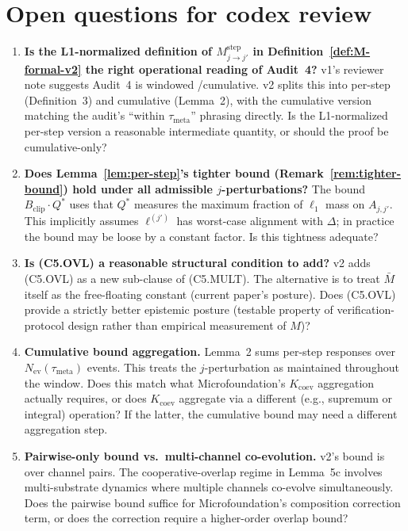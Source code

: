 \documentclass{article}
\newcommand{\Bclip}{B_{\mathrm{clip}}}
\newcommand{\Nev}{N_{\mathrm{ev}}}
\newcommand{\taumeta}{\tau_{\mathrm{meta}}}
\begin{document}
\section{Open questions for codex review}

\begin{enumerate}
\item \textbf{Is the L1-normalized definition of
  $M_{j \to j'}^{\mathrm{step}}$ in
  Definition~\ref{def:M-formal-v2} the right operational reading
  of Audit~4?}  v1's reviewer note suggests Audit~4 is windowed
  /cumulative.  v2 splits this into per-step (Definition~3) and
  cumulative (Lemma~2), with the cumulative version matching the
  audit's ``within $\taumeta$'' phrasing directly.  Is the
  L1-normalized per-step version a reasonable intermediate
  quantity, or should the proof be cumulative-only?

\item \textbf{Does Lemma~\ref{lem:per-step}'s tighter bound
  (Remark~\ref{rem:tighter-bound}) hold under all admissible
  $j$-perturbations?}  The bound $\Bclip \cdot Q^*$ uses that
  $Q^*$ measures the maximum fraction of $\ell_1$ mass on
  $A_{j, j'}$.  This implicitly assumes $\ell^{(j')}$ has worst-case
  alignment with $\Delta$; in practice the bound may be loose by a
  constant factor.  Is this tightness adequate?

\item \textbf{Is (C5.OVL) a reasonable structural condition to
  add?}  v2 adds (C5.OVL) as a new sub-clause of (C5.MULT).  The
  alternative is to treat $\bar{M}$ itself as the
  free-floating constant (current paper's posture).  Does
  (C5.OVL) provide a strictly better epistemic posture (testable
  property of verification-protocol design rather than empirical
  measurement of $M$)?

\item \textbf{Cumulative bound aggregation.}  Lemma~2 sums per-step
  responses over $\Nev(\taumeta)$ events.  This treats the
  $j$-perturbation as maintained throughout the window.  Does this
  match what Microfoundation's $K_{\mathrm{coev}}$ aggregation
  actually requires, or does $K_{\mathrm{coev}}$ aggregate via a
  different (e.g., supremum or integral) operation?  If the latter,
  the cumulative bound may need a different aggregation step.

\item \textbf{Pairwise-only bound vs.\ multi-channel co-evolution.}
  v2's bound is over channel pairs.  The cooperative-overlap
  regime in Lemma~5c involves multi-substrate dynamics where
  multiple channels co-evolve simultaneously.  Does the pairwise
  bound suffice for Microfoundation's composition correction term,
  or does the correction require a higher-order overlap bound?
\end{enumerate}
\end{document}
